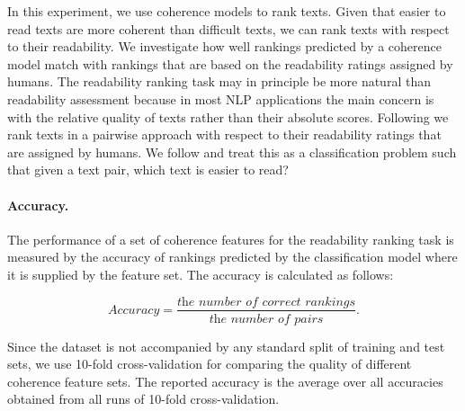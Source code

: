 In this experiment, we use coherence models to rank texts. 
Given that easier to read texts are more coherent than difficult texts, we can rank texts with respect to their readability. 
We investigate how well rankings predicted by a coherence model match with rankings that are based on the  readability ratings assigned by humans. 
The readability ranking task may in principle be more natural than readability assessment because in most NLP applications the main concern is with the relative quality of texts rather than their absolute scores. 
Following  we rank texts in a pairwise approach with respect to their readability ratings that are assigned by humans. 
We follow  and treat this as a classification problem such that given a text pair, which text is easier to read?

\paragraph{Accuracy.}
The performance of a set of coherence features for the readability ranking task is measured by the accuracy of rankings  predicted by the classification model where it is supplied by the feature set. 
The accuracy is calculated as follows:

\begin{equation}
Accuracy = \frac{\textit{the number of correct rankings}}{\textit{the number of pairs}}. 
\end{equation}

Since the dataset is not accompanied by any standard split of training and test sets, we use 10-fold cross-validation for comparing the quality of different coherence feature sets. 
The reported accuracy is the average over all accuracies obtained from all runs of 10-fold cross-validation. 

